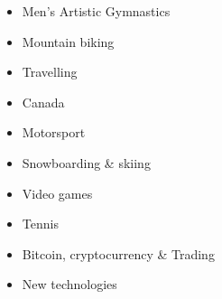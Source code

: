

\fontsize{9pt}{1em}\bodyfontlight\upshape\color{text}
{
    \begin{multicols}{3}
        \begin{itemize}
            \item Men's Artistic Gymnastics
            \item Mountain biking
            \item Travelling
            \item Canada
            \item Motorsport 
            \item Snowboarding \& skiing
            \item Video games
            \item Tennis
            \item Bitcoin, cryptocurrency \& Trading
            \item New technologies
        \end{itemize}
    \end{multicols}
}

